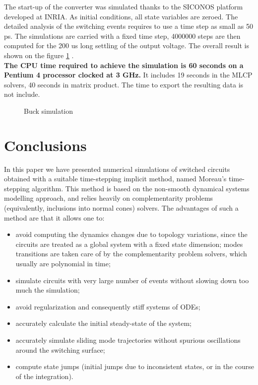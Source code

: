 \documentclass{article}
\begin{document}
 The start-up of the converter was simulated thanks to the SICONOS platform
developed at INRIA. As initial conditions, all state variables are zeroed.
The detailed analysis of the switching events requires to use a time step as
small as 50 ps. The simulations are carried with a fixed time step, 4000000 steps
are then computed for the 200 us long settling of the output voltage.
The overall result is shown on the figure \ref{fig:figSimuBuck} .\\
\textbf{The CPU time required to achieve the simulation is 60 seconds on a
Pentium 4 processor clocked at 3 GHz.} It includes 19 seconds in the MLCP solvers, 40 seconds in
matrix product. The time to export the resulting data is not include.
\begin{figure}[h]
  \centering
   \scalebox{0.6}{
  
  }
  \caption{Buck simulation}
  \label{fig:figSimuBuck}
\end{figure}

\section{Conclusions}
\label{section5}



In this paper we have presented numerical simulations of switched circuits obtained with a suitable time-stepping implicit method, named Moreau's time-stepping algorithm. This method is based on the non-smooth dynamical systems modelling approach, and relies heavily on complementarity problems (equivalently, inclusions into normal cones) solvers. The advantages of such a method are that it allows one to:

\begin{itemize}

\item avoid computing the dynamics changes due to topology variations, since the circuits are treated as a global system with a fixed state dimension; modes transitions are taken care of by the complementarity problem solvers, which usually are polynomial in time;

\item simulate circuits with very large number of events without slowing down too much the simulation;

\item avoid regularization and consequently stiff systems of ODEs;

\item accurately calculate the initial steady-state of the system;

\item accurately simulate sliding mode trajectories without spurious oscillations around the switching surface;

\item compute state jumps (initial jumps due to inconsistent states, or in the course of the integration). 

\end{itemize}
\end{document}
